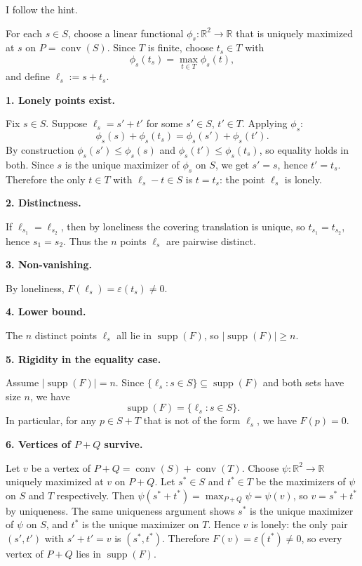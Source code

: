 
I follow the hint.

For each \(s\in S\), choose a linear functional \(\phi_s:\mathbb{R}^2\to\mathbb{R}\) that is uniquely maximized at \(s\) on \(P=\operatorname{conv}(S)\). Since \(T\) is finite, choose \(t_s\in T\) with
\[
\phi_s(t_s)=\max_{t\in T}\phi_s(t),
\]
and define \(\ell_s:=s+t_s\).

\medskip
\textbf{1. Lonely points exist.}

Fix \(s\in S\). Suppose \(\ell_s = s'+t'\) for some \(s'\in S\), \(t'\in T\).
Applying \(\phi_s\):
\[
\phi_s(s)+\phi_s(t_s)=\phi_s(s')+\phi_s(t').
\]
By construction \(\phi_s(s')\le\phi_s(s)\) and \(\phi_s(t')\le\phi_s(t_s)\), so equality holds in both.
Since \(s\) is the unique maximizer of \(\phi_s\) on \(S\), we get \(s'=s\), hence \(t'=t_s\).
Therefore the only \(t\in T\) with \(\ell_s - t\in S\) is \(t=t_s\): the point \(\ell_s\) is lonely.

\medskip
\textbf{2. Distinctness.}

If \(\ell_{s_1}=\ell_{s_2}\), then by loneliness the covering translation is unique, so \(t_{s_1}=t_{s_2}\), hence \(s_1=s_2\).
Thus the \(n\) points \(\ell_s\) are pairwise distinct.

\medskip
\textbf{3. Non-vanishing.}

By loneliness, \(F(\ell_s)=\varepsilon(t_s)\neq 0\).

\medskip
\textbf{4. Lower bound.}

The \(n\) distinct points \(\ell_s\) all lie in \(\operatorname{supp}(F)\), so \(|\operatorname{supp}(F)|\ge n\).

\medskip
\textbf{5. Rigidity in the equality case.}

Assume \(|\operatorname{supp}(F)|=n\). Since \(\{\ell_s:s\in S\}\subseteq\operatorname{supp}(F)\) and both sets have size \(n\), we have
\[
\operatorname{supp}(F)=\{\ell_s:s\in S\}.
\]
In particular, for any \(p\in S+T\) that is not of the form \(\ell_s\), we have \(F(p)=0\).

\medskip
\textbf{6. Vertices of \(P+Q\) survive.}

Let \(v\) be a vertex of \(P+Q=\operatorname{conv}(S)+\operatorname{conv}(T)\).
Choose \(\psi:\mathbb{R}^2\to\mathbb{R}\) uniquely maximized at \(v\) on \(P+Q\).
Let \(s^*\in S\) and \(t^*\in T\) be the maximizers of \(\psi\) on \(S\) and \(T\) respectively.
Then \(\psi(s^*+t^*)=\max_{P+Q}\psi=\psi(v)\), so \(v=s^*+t^*\) by uniqueness.
The same uniqueness argument shows \(s^*\) is the unique maximizer of \(\psi\) on \(S\), and \(t^*\) is the unique maximizer on \(T\).
Hence \(v\) is lonely: the only pair \((s',t')\) with \(s'+t'=v\) is \((s^*,t^*)\).
Therefore \(F(v)=\varepsilon(t^*)\neq 0\), so every vertex of \(P+Q\) lies in \(\operatorname{supp}(F)\).

